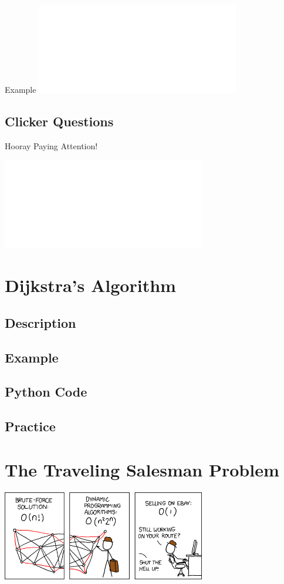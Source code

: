 \documentclass{beamer}
\begin{document}
\begin{frame}{Example}
\includegraphics<1>[width=3.5in]{weighted_ex_1.pdf}%
\end{frame}

\subsection{Clicker Questions}{Hooray Paying Attention!}
\begin{frame}{}
\includegraphics<1>[width=3.5in]{weighted.pdf}
\end{frame}

\section{Dijkstra's Algorithm}
\subsection{Description}
\subsection{Example}
\subsection{Python Code}
\subsection{Practice}

\section{The Traveling Salesman Problem}
\begin{frame}{}
\includegraphics[width=3.5in]{travelling_salesman_problem.png}
\end{frame}
\end{document}

